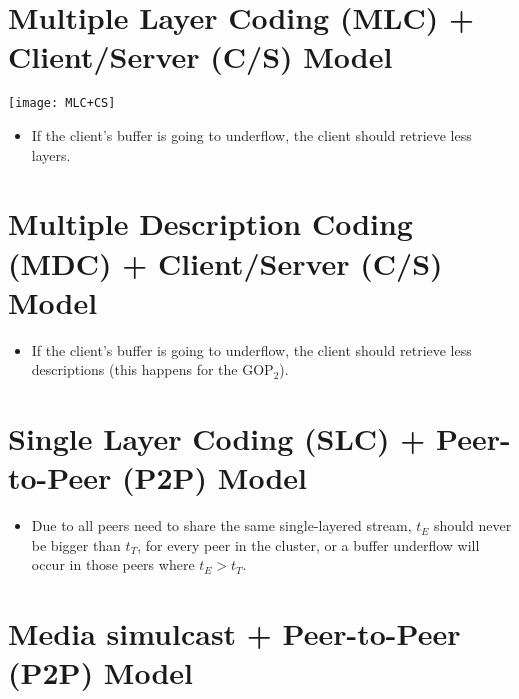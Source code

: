 
\section{Multiple Layer Coding (MLC) + Client/Server (C/S) Model}

\begin{center}
  \texttt{[image: MLC+CS]}
\end{center}

\begin{itemize}
\item If the client's buffer is going to underflow, the client should
  retrieve less layers.
\end{itemize}


\section{Multiple Description Coding (MDC) + Client/Server (C/S) Model}


\begin{itemize}
\item If the client's buffer is going to underflow, the client should
  retrieve less descriptions (this happens for the GOP$_2$).
\end{itemize}


\section{Single Layer Coding (SLC) + Peer-to-Peer (P2P) Model}

\begin{itemize}
\item Due to all peers need to share the same single-layered stream,
  $t_E$ should never be bigger than $t_T$, for every peer in the cluster,
  or a buffer underflow will occur in those peers where $t_E>t_T$.
\end{itemize}


\section{Media simulcast + Peer-to-Peer (P2P) Model}

